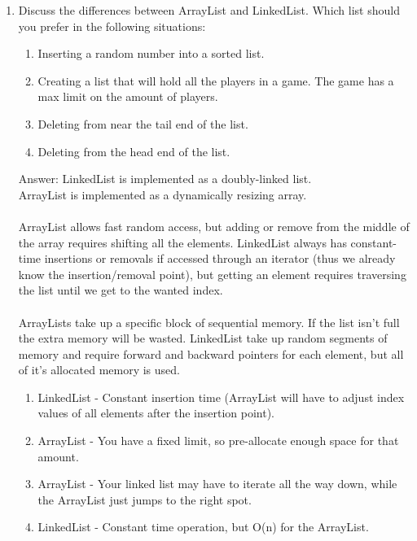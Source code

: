 \documentclass[11pt]{article}
\newenvironment{answer}{\large\lstset{basicstyle=\large\ttfamily}\color{white} \small{Answer:}}{}
\newenvironment{answer}{\large\lstset{basicstyle=\large\ttfamily}\color{red} \small{Answer:}}{}
\begin{document}
\begin{enumerate}
\item Discuss the differences between ArrayList and LinkedList. Which list should you prefer in the following situations:
\begin{enumerate}
\item Inserting a random number into a sorted list.
\item Creating a list that will hold all the players in a game.  The game has a max limit on the amount of players.  
\item Deleting from near the tail end of the list.
\item Deleting from the head end of the list.
\end{enumerate}
\begin{answer}
LinkedList is implemented as a doubly-linked list.
\\ArrayList is implemented as a dynamically resizing array.
\\ \\ArrayList allows fast random access, but adding or remove from the middle of the array
requires shifting all the elements. LinkedList always has constant-time insertions or removals
if accessed through an iterator (thus we already know the insertion/removal point), but getting
an element requires traversing the list until we get to the wanted index.
\\ \\ArrayLists take up a specific block of sequential memory. If the list isn't full the extra
memory will be wasted. LinkedList take up random segments of memory and require
forward and backward pointers for each element, but all of it's allocated memory is used.
\begin{enumerate}
\item LinkedList - Constant insertion time (ArrayList will have to adjust index values of all elements after the insertion point).
\item ArrayList - You have a fixed limit, so pre-allocate enough space for that amount.
\item ArrayList - Your linked list may have to iterate all the way down, while the ArrayList just jumps to the right spot.
\item LinkedList - Constant time operation, but O(n) for the ArrayList.
\end{enumerate}
\end{answer}




\end{enumerate}
\end{document}
